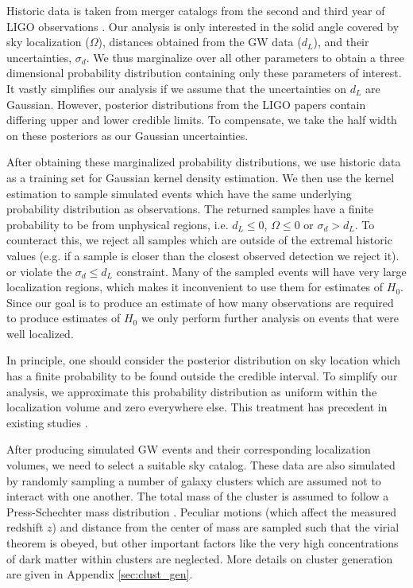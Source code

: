 
Historic data is taken from merger catalogs from the second and third year of LIGO observations \cite{GWTC_2,GWTC_3}. Our analysis is only interested in the solid angle covered by sky localization ($\Omega$), distances obtained from the GW data ($d_L$), and their uncertainties, $\sigma_d$. We thus marginalize over all other parameters to obtain a three dimensional probability distribution containing only these parameters of interest. It vastly simplifies our analysis if we assume that the uncertainties on $d_L$ are Gaussian. However, posterior distributions from the LIGO papers contain differing upper and lower credible limits. To compensate, we take the half width on these posteriors as our Gaussian uncertainties.

After obtaining these marginalized probability distributions, we use historic data as a training set for Gaussian kernel density estimation. We then use the kernel estimation to sample simulated events which have the same underlying probability distribution as observations. The returned samples have a finite probability to be from unphysical regions, i.e. $d_L \leq 0$, $\Omega\leq 0$ or $\sigma_d > d_L$. To counteract this, we reject all samples which are outside of the extremal historic values (e.g. if a sample is closer than the closest observed detection we reject it). or violate the $\sigma_d \leq d_L$ constraint. Many of the sampled events will have very large localization regions, which makes it inconvenient to use them for estimates of $H_0$. Since our goal is to produce an estimate of how many observations are required to produce estimates of $H_0$ we only perform further analysis on events that were well localized.

In principle, one should consider the posterior distribution on sky location which has a finite probability to be found outside the credible interval. To simplify our analysis, we approximate this probability distribution as uniform within the localization volume and zero everywhere else. This treatment has precedent in existing studies \cite{Nair_2018, GW170814_DES}.

After producing simulated GW events and their corresponding localization volumes, we need to select a suitable sky catalog. These data are also simulated by randomly sampling a number of galaxy clusters which are assumed not to interact with one another. The total mass of the cluster is assumed to follow a Press-Schechter mass distribution \cite{Press_1974}. Peculiar motions (which affect the measured redshift $z$) and distance from the center of mass are sampled such that the virial theorem is obeyed, but other important factors like the very high concentrations of dark matter within clusters are neglected. More details on cluster generation are given in Appendix \ref{sec:clust_gen}.
    
